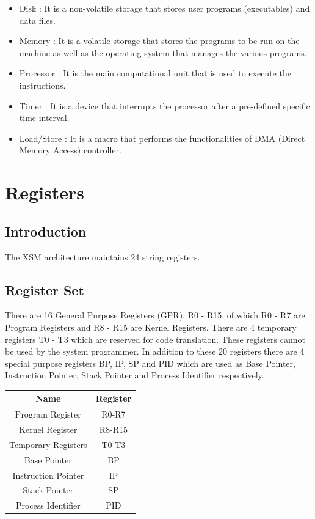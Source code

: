 \documentclass[11pt]{article}
\begin{document}
\begin{itemize}
\item Disk : It is a non-volatile storage that stores user programs (executables) and data files.
\item Memory : It is a volatile storage that stores the programs to be run on the machine as well as the operating system that manages the various programs.
\item Processor : It is the main computational unit that is used to execute the instructions.
\item Timer : It is a device that interrupts the processor after a pre-defined specific time interval.
\item Load/Store : It is a macro that performs the functionalities of DMA (Direct Memory Access) controller.
\end{itemize}






\section{Registers}

\subsection{Introduction}
The XSM architecture maintains 24 string registers.

\subsection{Register Set}
There are 16 General Purpose Registers (GPR), R0 - R15, of which R0 - R7 are Program Registers and R8 - R15 are Kernel Registers. There are 4 temporary registers T0 - T3 which are reserved for code translation. These registers cannot be used by the system programmer. In addition to these 20 registers there are 4 special purpose registers BP, IP, SP and PID which are used as Base Pointer, Instruction Pointer, Stack Pointer and Process Identifier respectively.\\


\begin{center}
\begin{tabular}{|c|c|}
\hline Name & Register \\ 
\hline Program Register & R0-R7 \\ 
\hline Kernel Register & R8-R15 \\ 
\hline Temporary Registers & T0-T3 \\ 
\hline Base Pointer & BP \\ 
\hline Instruction Pointer & IP \\ 
\hline Stack Pointer & SP \\ 
\hline Process Identifier & PID \\ 
\hline 
\end{tabular} 
\end{center}
\end{document}
